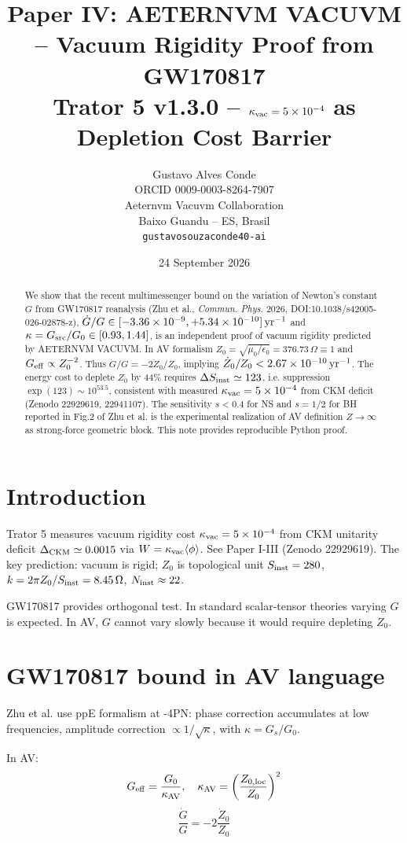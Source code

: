 \documentclass[11pt,a4paper]{article}
\title{Paper IV: AETERNVM VACUVM -- Vacuum Rigidity Proof from GW170817\\
Trator 5 v1.3.0 -- $\kappa_{\rm vac}=5\times10^{-4}$ as Depletion Cost Barrier}
\author{Gustavo Alves Conde\\ORCID 0009-0003-8264-7907\\Aeternvm Vacuvm Collaboration\\Baixo Guandu -- ES, Brasil\\ \texttt{gustavosouzaconde40-ai}}
\date{24 September 2026}
\begin{document}
\maketitle

\begin{abstract}
We show that the recent multimessenger bound on the variation of Newton's constant $G$ from GW170817 reanalysis (Zhu et al., \textit{Commun. Phys.} 2026, DOI:10.1038/s42005-026-02878-z), $\dot G/G \in [-3.36\times10^{-9},+5.34\times10^{-10}]\,{\rm yr^{-1}}$ and $\kappa=G_{\rm src}/G_0\in[0.93,1.44]$, is an independent proof of vacuum rigidity predicted by AETERNVM VACUVM. In AV formalism $Z_0=\sqrt{\mu_0/\epsilon_0}=376.73\,\Omega\equiv1$ and $G_{\rm eff}\propto Z_0^{-2}$. Thus $\dot G/G=-2\dot Z_0/Z_0$, implying $\dot Z_0/Z_0<2.67\times10^{-10}\,{\rm yr^{-1}}$. The energy cost to deplete $Z_0$ by $44\%$ requires $\Delta S_{\rm inst}\simeq123$, i.e. suppression $\exp(123)\sim10^{53.5}$, consistent with measured $\kappa_{\rm vac}=5\times10^{-4}$ from CKM deficit (Zenodo 22929619, 22941107). The sensitivity $s<0.4$ for NS and $s=1/2$ for BH reported in Fig.2 of Zhu et al. is the experimental realization of AV definition $Z\to\infty$ as strong-force geometric block. This note provides reproducible Python proof.
\end{abstract}

\section{Introduction}
Trator 5 measures vacuum rigidity cost $\kappa_{\rm vac}=5\times10^{-4}$ from CKM unitarity deficit $\Delta_{\rm CKM}\simeq0.0015$ via $W=\kappa_{\rm vac}\langle\phi\rangle$. See Paper I-III (Zenodo 22929619). The key prediction: vacuum is rigid; $Z_0$ is topological unit $S_{\rm inst}=280$, $k=2\pi Z_0/S_{\rm inst}=8.45\,\Omega$, $N_{\rm inst}\approx22$.

GW170817 provides orthogonal test. In standard scalar-tensor theories varying $G$ is expected. In AV, $G$ cannot vary slowly because it would require depleting $Z_0$.

\section{GW170817 bound in AV language}
Zhu et al. use ppE formalism at -4PN: phase correction accumulates at low frequencies, amplitude correction $\propto 1/\sqrt{\kappa}$, with $\kappa=G_s/G_0$.

In AV:
\begin{equation}
G_{\rm eff} = \frac{G_0}{\kappa_{\rm AV}},\quad \kappa_{\rm AV} = \left(\frac{Z_{0,{\rm loc}}}{Z_0}\right)^2
\end{equation}
\begin{equation}
\frac{\dot G}{G} = -2\frac{\dot Z_0}{Z_0}
\end{equation}
\end{document}
